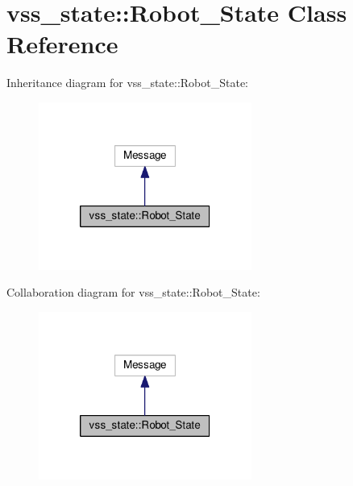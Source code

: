 \hypertarget{classvss__state_1_1Robot__State}{\section{vss\-\_\-state\-:\-:Robot\-\_\-\-State Class Reference}
\label{classvss__state_1_1Robot__State}
}


Inheritance diagram for vss\-\_\-state\-:\-:Robot\-\_\-\-State\-:
\nopagebreak
\begin{figure}[H]
\begin{center}
\leavevmode
\includegraphics[width=198pt]{classvss__state_1_1Robot__State__inherit__graph}
\end{center}
\end{figure}


Collaboration diagram for vss\-\_\-state\-:\-:Robot\-\_\-\-State\-:
\nopagebreak
\begin{figure}[H]
\begin{center}
\leavevmode
\includegraphics[width=198pt]{classvss__state_1_1Robot__State__coll__graph}
\end{center}
\end{figure}
